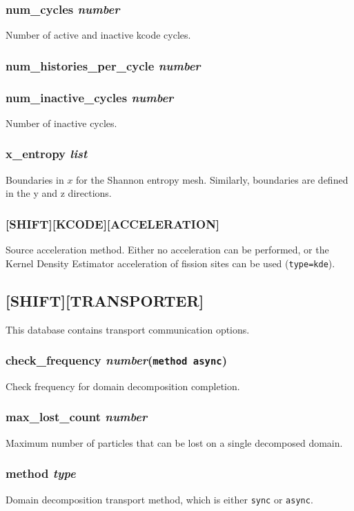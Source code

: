 \documentclass[10pt]{article}
\begin{document}
\subsubsection{num\_cycles \textit{number}}
Number of active and inactive kcode cycles. 

\subsubsection{num\_histories\_per\_cycle \textit{number}}

\subsubsection{num\_inactive\_cycles \textit{number}}
Number of inactive cycles.

\subsubsection{x\_entropy \textit{list}}
Boundaries in \(x\) for the Shannon entropy mesh. Similarly, boundaries are defined in the y and z directions.

\subsubsection{[SHIFT][KCODE][ACCELERATION]}
Source acceleration method. Either no acceleration can be performed, or the Kernel Density Estimator acceleration of fission sites can be used (\texttt{type=kde}).

\subsection{[SHIFT][TRANSPORTER]}
This database contains transport communication options.

\subsubsection{check\_frequency \textit{number}\quad\quad\quad(\texttt{method async})}
Check frequency for domain decomposition completion. 

\subsubsection{max\_lost\_count \textit{number}}
Maximum number of particles that can be lost on a single decomposed domain.

\subsubsection{method \textit{type}}
Domain decomposition transport method, which is either \texttt{sync} or \texttt{async}.
\end{document}
